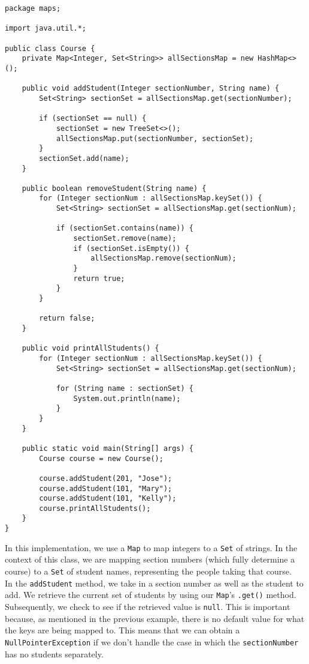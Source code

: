 \begin{lstlisting}
package maps;

import java.util.*;

public class Course {
	private Map<Integer, Set<String>> allSectionsMap = new HashMap<>();

	public void addStudent(Integer sectionNumber, String name) {
		Set<String> sectionSet = allSectionsMap.get(sectionNumber);

		if (sectionSet == null) {
			sectionSet = new TreeSet<>();
			allSectionsMap.put(sectionNumber, sectionSet);
		}
		sectionSet.add(name);
	}

	public boolean removeStudent(String name) {
		for (Integer sectionNum : allSectionsMap.keySet()) {
			Set<String> sectionSet = allSectionsMap.get(sectionNum);
			
			if (sectionSet.contains(name)) {
				sectionSet.remove(name);
				if (sectionSet.isEmpty()) {
					allSectionsMap.remove(sectionNum);
				}
				return true;
			}
		}

		return false;
	}

	public void printAllStudents() {
		for (Integer sectionNum : allSectionsMap.keySet()) {
			Set<String> sectionSet = allSectionsMap.get(sectionNum);
			
			for (String name : sectionSet) {
				System.out.println(name);
			}
		}
	}

	public static void main(String[] args) {
		Course course = new Course();

		course.addStudent(201, "Jose");
		course.addStudent(101, "Mary");
		course.addStudent(101, "Kelly");
		course.printAllStudents();
	}
}
\end{lstlisting}

In this implementation, we use a \verb!Map! to map integers to a \verb!Set! of strings. In the context of this class, we are mapping section numbers (which fully determine a course) to a \verb!Set! of student names, representing the people taking that course. \\

In the \verb!addStudent! method, we take in a section number as well as the student to add. We retrieve the current set of students by using our \verb!Map!'s \verb!.get()! method. Subsequently, we check to see if the retrieved value is \verb!null!. This is important because, as mentioned in the previous example, there is no default value for what the keys are being mapped to. This means that we can obtain a \verb!NullPointerException! if we don't handle the case in which the \verb!sectionNumber! has no students separately. \\

